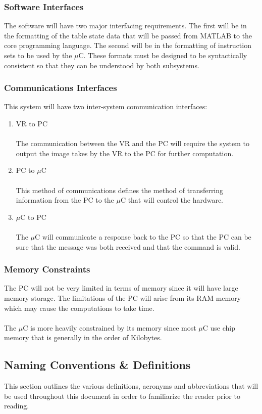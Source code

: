 \documentclass[titlepage]{article}
\begin{document}
\subsubsection{Software Interfaces}
The software will have two major interfacing requirements. The first will be in the formatting of the table state data that will be passed from MATLAB to the core programming language. The second will be in the formatting of instruction sets to be used by the $\mu$C. These formats must be designed to be syntactically consistent so that they can be understood by both subsystems.
\subsubsection{Communications Interfaces}
This system will have two inter-system communication interfaces:
\begin{enumerate}
	\item VR to PC\\\\
	The communication between the VR and the PC will require the system to output the image takes by the VR to the PC for further computation.
	\item PC to $\mu$C\\\\
	This method of communications defines the method of transferring information from the PC to the $\mu$C that will control the hardware.
	\item $\mu$C to PC\\\\
	The $\mu$C will communicate a response back to the PC so that the PC can be sure that the message was both received and that the command is valid.
\end{enumerate}
\subsubsection{Memory Constraints}
The PC will not be very limited in terms of memory since it will have large memory storage. The limitations of the PC will arise from its RAM memory which may cause the computations to take time.\\\\
The $\mu$C is more heavily constrained by its memory since most $\mu$C use chip memory that is generally in the order of Kilobytes.
 
\subsection{Naming Conventions \& Definitions}
This section outlines the various definitions, acronyms and abbreviations that will be used throughout this document in order to familiarize the reader prior to reading.
\end{document}
